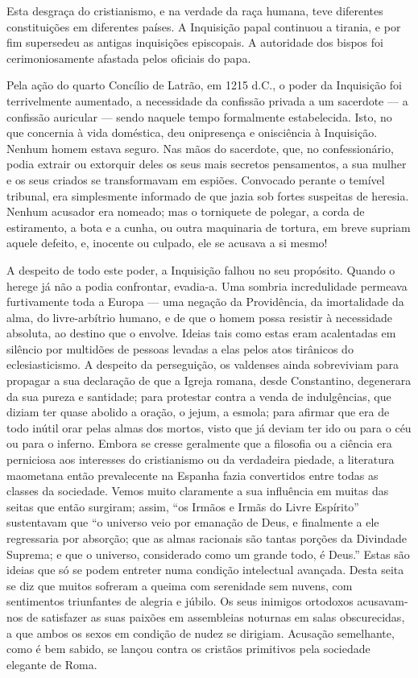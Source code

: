 \documentclass[11pt,a5paper,twoside,openany]{book}
\begin{document}
Esta desgraça do cristianismo, e na verdade da raça humana, teve diferentes constituições em diferentes países. A Inquisição papal continuou a tirania, e por fim supersedeu as antigas inquisições episcopais. A autoridade dos bispos foi cerimoniosamente afastada pelos oficiais do papa.

Pela ação do quarto Concílio de Latrão, em 1215 d.C., o poder da Inquisição foi terrivelmente aumentado, a necessidade da confissão privada a um sacerdote — a confissão auricular — sendo naquele tempo formalmente estabelecida. Isto, no que concernia à vida doméstica, deu onipresença e onisciência à Inquisição. Nenhum homem estava seguro. Nas mãos do sacerdote, que, no confessionário, podia extrair ou extorquir deles os seus mais secretos pensamentos, a sua mulher e os seus criados se transformavam em espiões. Convocado perante o temível tribunal, era simplesmente informado de que jazia sob fortes suspeitas de heresia. Nenhum acusador era nomeado; mas o torniquete de polegar, a corda de estiramento, a bota e a cunha, ou outra maquinaria de tortura, em breve supriam aquele defeito, e, inocente ou culpado, ele se acusava a si mesmo!

A despeito de todo este poder, a Inquisição falhou no seu propósito. Quando o herege já não a podia confrontar, evadia-a. Uma sombria incredulidade permeava furtivamente toda a Europa — uma negação da Providência, da imortalidade da alma, do livre-arbítrio humano, e de que o homem possa resistir à necessidade absoluta, ao destino que o envolve. Ideias tais como estas eram acalentadas em silêncio por multidões de pessoas levadas a elas pelos atos tirânicos do eclesiasticismo. A despeito da perseguição, os valdenses ainda sobreviviam para propagar a sua declaração de que a Igreja romana, desde Constantino, degenerara da sua pureza e santidade; para protestar contra a venda de indulgências, que diziam ter quase abolido a oração, o jejum, a esmola; para afirmar que era de todo inútil orar pelas almas dos mortos, visto que já deviam ter ido ou para o céu ou para o inferno. Embora se cresse geralmente que a filosofia ou a ciência era perniciosa aos interesses do cristianismo ou da verdadeira piedade, a literatura maometana então prevalecente na Espanha fazia convertidos entre todas as classes da sociedade. Vemos muito claramente a sua influência em muitas das seitas que então surgiram; assim, “os Irmãos e Irmãs do Livre Espírito” sustentavam que “o universo veio por emanação de Deus, e finalmente a ele regressaria por absorção; que as almas racionais são tantas porções da Divindade Suprema; e que o universo, considerado como um grande todo, é Deus.” Estas são ideias que só se podem entreter numa condição intelectual avançada. Desta seita se diz que muitos sofreram a queima com serenidade sem nuvens, com sentimentos triunfantes de alegria e júbilo. Os seus inimigos ortodoxos acusavam-nos de satisfazer as suas paixões em assembleias noturnas em salas obscurecidas, a que ambos os sexos em condição de nudez se dirigiam. Acusação semelhante, como é bem sabido, se lançou contra os cristãos primitivos pela sociedade elegante de Roma.
\end{document}
